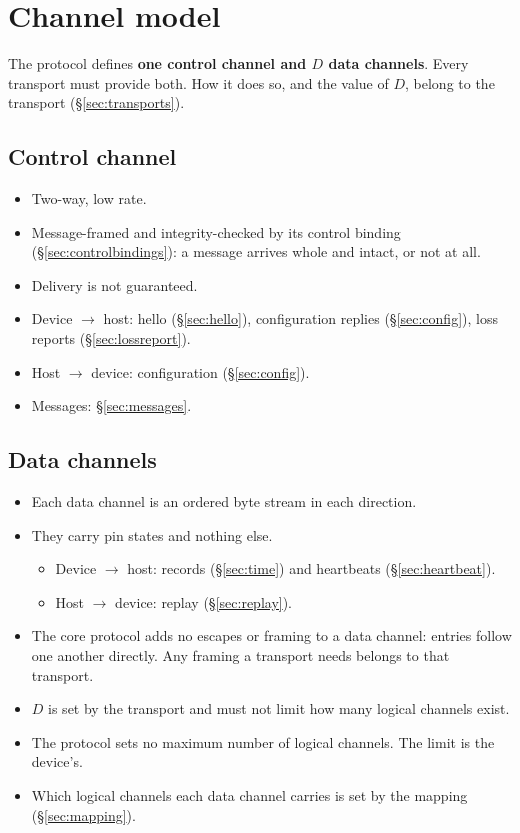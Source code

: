 \documentclass[11pt,a4paper]{article}
\newcommand{\sref}[1]{\S\ref{#1}}
\begin{document}
\section{Channel model}\label{sec:channels}

The protocol defines \textbf{one control channel and $D$ data channels}. Every
transport must provide both. How it does so, and the value of $D$, belong to the
transport (\sref{sec:transports}).

\subsection{Control channel}\label{sec:control}

\begin{itemize}
  \item Two-way, low rate.
  \item Message-framed and integrity-checked by its control binding
        (\sref{sec:controlbindings}): a message arrives whole and intact, or not at
        all.
  \item Delivery is not guaranteed.
  \item Device $\to$ host: hello (\sref{sec:hello}), configuration replies
        (\sref{sec:config}), loss reports (\sref{sec:lossreport}).
  \item Host $\to$ device: configuration (\sref{sec:config}).
  \item Messages: \sref{sec:messages}.
\end{itemize}

\subsection{Data channels}\label{sec:data}

\begin{itemize}
  \item Each data channel is an ordered byte stream in each direction.
  \item They carry pin states and nothing else.
    \begin{itemize}
      \item Device $\to$ host: records (\sref{sec:time}) and heartbeats
            (\sref{sec:heartbeat}).
      \item Host $\to$ device: replay (\sref{sec:replay}).
    \end{itemize}
  \item The core protocol adds no escapes or framing to a data channel: entries follow
        one another directly. Any framing a transport needs belongs to that transport.
  \item $D$ is set by the transport and must not limit how many logical channels exist.
  \item The protocol sets no maximum number of logical channels. The limit is the
        device's.
  \item Which logical channels each data channel carries is set by the mapping
        (\sref{sec:mapping}).
\end{itemize}
\end{document}
